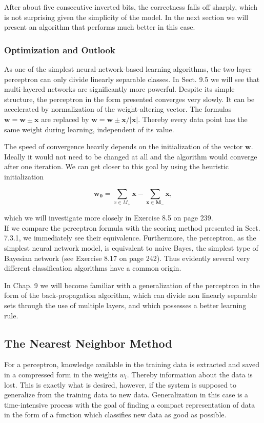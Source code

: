 \documentclass[10pt]{article}
\begin{document}
After about five consecutive inverted bits, the correctness falls off sharply, which is not surprising given the simplicity of the model. In the next section we will present an algorithm that performs much better in this case.

\subsubsection*{Optimization and Outlook}
As one of the simplest neural-network-based learning algorithms, the two-layer perceptron can only divide linearly separable classes. In Sect. 9.5 we will see that multi-layered networks are significantly more powerful. Despite its simple\\
structure, the perceptron in the form presented converges very slowly. It can be accelerated by normalization of the weight-altering vector. The formulas $\boldsymbol{w}=\boldsymbol{w} \pm \boldsymbol{x}$ are replaced by $\boldsymbol{w}=\boldsymbol{w} \pm \boldsymbol{x} /|\boldsymbol{x}|$. Thereby every data point has the same weight during learning, independent of its value.

The speed of convergence heavily depends on the initialization of the vector $\boldsymbol{w}$. Ideally it would not need to be changed at all and the algorithm would converge after one iteration. We can get closer to this goal by using the heuristic initialization

$$
\boldsymbol{w}_{\mathbf{0}}=\sum_{x \in M_{+}} \boldsymbol{x}-\sum_{\boldsymbol{x} \in \boldsymbol{M}_{-}} \boldsymbol{x},
$$

which we will investigate more closely in Exercise 8.5 on page 239.\\
If we compare the perceptron formula with the scoring method presented in Sect. 7.3.1, we immediately see their equivalence. Furthermore, the perceptron, as the simplest neural network model, is equivalent to naive Bayes, the simplest type of Bayesian network (see Exercise 8.17 on page 242). Thus evidently several very different classification algorithms have a common origin.

In Chap. 9 we will become familiar with a generalization of the perceptron in the form of the back-propagation algorithm, which can divide non linearly separable sets through the use of multiple layers, and which possesses a better learning rule.

\subsection*{The Nearest Neighbor Method}
For a perceptron, knowledge available in the training data is extracted and saved in a compressed form in the weights $w_{i}$. Thereby information about the data is lost. This is exactly what is desired, however, if the system is supposed to generalize from the training data to new data. Generalization in this case is a time-intensive process with the goal of finding a compact representation of data in the form of a function which classifies new data as good as possible.
\end{document}
